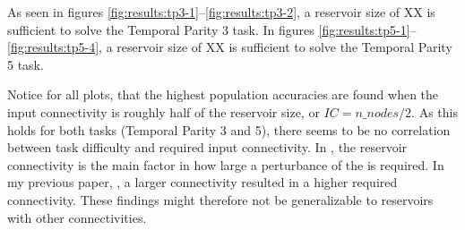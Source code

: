 As seen in figures \ref{fig:results:tp3-1}–\ref{fig:results:tp3-2},
a reservoir size of XX is sufficient to solve the Temporal Parity 3 task.
In figures \ref{fig:results:tp5-1}–\ref{fig:results:tp5-4},
a reservoir size of XX is sufficient to solve the Temporal Parity 5 task.

Notice for all plots, that the highest population accuracies are found when the input connectivity is roughly half of the reservoir size, or $IC=n\_nodes/2$.
As this holds for both tasks (Temporal Parity 3 and 5), there seems to be no correlation between task difficulty and required input connectivity.
In , the reservoir connectivity is the main factor in how large a perturbance of the is required.
In my previous paper, , a larger connectivity resulted in a higher required connectivity.
These findings might therefore not be generalizable to reservoirs with other connectivities.
